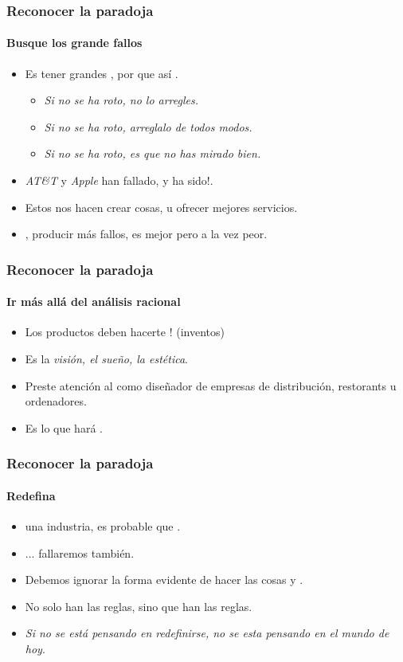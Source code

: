 \frame
{
\frametitle{Reconocer la paradoja}
\framesubtitle{Busque los grande fallos}
\begin{itemize}
	\item Es  tener grandes , por que así .
	\begin{itemize}
		\item \emph{Si no se ha roto, no lo arregles.}
		\item \emph{Si no se ha roto, arreglalo de todos modos.}
		\item \emph{Si no se ha roto, es que no has mirado bien.}
	\end{itemize}
	\item \emph{AT\&T} y \emph{Apple} han fallado, y ha sido!.
	\item Estos  nos hacen crear  cosas, u ofrecer mejores servicios.
	\item {}, producir más fallos, es mejor pero a la vez peor.
\end{itemize}
}

\frame
{
\frametitle{Reconocer la paradoja}
\framesubtitle{Ir más allá del análisis racional}
\begin{itemize}
	\item Los productos deben hacerte ! (inventos)
	\item Es la \emph{visión, el sueño, la estética}.
	\item Preste atención al  como diseñador de empresas de distribución, restorants u ordenadores.
	\item Es lo que hará .
\end{itemize}
}

\frame
{
\frametitle{Reconocer la paradoja}
\framesubtitle{Redefina}
\begin{itemize}
	\item {} una industria, es probable que .
	\item {} ... fallaremos también.
	\item Debemos ignorar la forma evidente de hacer las cosas y .
	\item No solo han  las reglas, sino que han  las reglas.
	\item \emph{Si no se está pensando en redefinirse, no se esta pensando en el mundo de hoy}.
\end{itemize}
}

